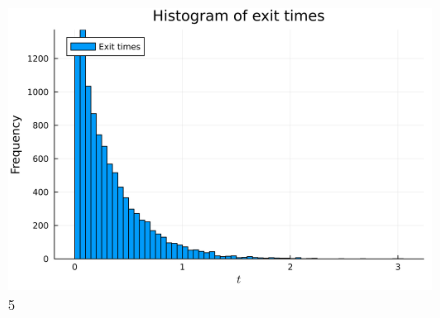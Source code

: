 \documentclass{article}
\begin{document}
      \begin{figure}[H]
            \centering
            \includegraphics[scale=0.05]{imgs/5exit_times_histogram.png}
            \caption{5}
            \label{fig:5_exittimeshist}
      \end{figure}
\end{document}

